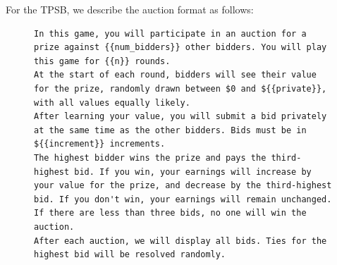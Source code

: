 For the TPSB, we describe the auction format as follows:
\begin{figure}
\centering
\begin{minipage}{0.95\textwidth}
\begin{lstlisting}
In this game, you will participate in an auction for a prize against {{num_bidders}} other bidders. You will play this game for {{n}} rounds.
At the start of each round, bidders will see their value for the prize, randomly drawn between $0 and ${{private}}, with all values equally likely.
After learning your value, you will submit a bid privately at the same time as the other bidders. Bids must be in ${{increment}} increments.
The highest bidder wins the prize and pays the third-highest bid. If you win, your earnings will increase by your value for the prize, and decrease by the third-highest bid. If you don't win, your earnings will remain unchanged. If there are less than three bids, no one will win the auction.
After each auction, we will display all bids. Ties for the highest bid will be resolved randomly.
\end{lstlisting}
\end{minipage}
\label{fig:sealbid_prompt}
\end{figure}


